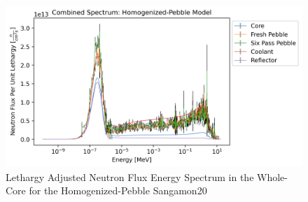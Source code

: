 \begin{figure}[H]
\centering
  \includegraphics[width=0.95\linewidth]{figures/all_spec_homog_v2_er}
  \caption{Lethargy Adjusted Neutron Flux Energy Spectrum in the Whole-Core for the Homogenized-Pebble Sangamon20}
  \label{fig:hom-all}
\end{figure}
